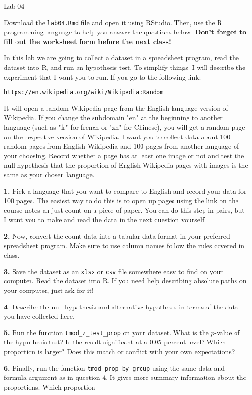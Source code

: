 \documentclass{tufte-handout}
\begin{document}
\justify

{\LARGE Lab 04}

\vspace*{18pt}

Download the \texttt{lab04.Rmd} file and open it using RStudio. Then, use the
R programming language to help you answer the questions below. \textbf{Don't
forget to fill out the worksheet form before the next class!}

In this lab we are going to collect a dataset in a spreadsheet
program, read the dataset into R, and run an hypothesis test. To simplify
things, I will describe the experiment that I want you to run. If you go
to the following link:

\begin{center}
\texttt{https://en.wikipedia.org/wiki/Wikipedia:Random}
\end{center}

It will open a random Wikipedia page from the English language version of
Wikipedia. If you change the subdomain "en" at the beginning to another
language (such as "fr" for french or "zh" for Chinese), you will get a random
page on the respective version of Wikipedia. I want you to collect data about
100 random pages from English Wikipedia and 100 pages from another language of
your choosing. Record whether a page has at least one image or not and test
the null-hypothesis that the proportion of English Wikipedia pages with images
is the same as your chosen language.

\vspace*{12pt}

\textbf{1.} Pick a language that you want to compare to English and record
your data for 100 pages. The easiest way to do this is to open up pages using
the link on the course notes an just count on a piece of paper. You can do
this step in pairs, but I want you to make and read the data in the next
question yourself.

\textbf{2.} Now, convert the count data into a tabular data format in your
preferred spreadsheet program. Make sure to use column names follow the rules
covered in class.

\textbf{3.} Save the dataset as an \texttt{xlsx} or \texttt{csv} file
somewhere easy to find on your computer. Read the dataset into R. If you need
help  describing absolute paths on your computer, just ask for it!

\textbf{4.} Describe the null-hypothesis and alternative hypothesis in terms
of the data you have collected here.

\textbf{5.} Run the function \texttt{tmod\_z\_test\_prop} on your dataset.
What is the $p$-value of the hypothesis test? Is the result significant at a
$0.05$ percent level? Which proportion is larger? Does this match or conflict
with your own expectations?

\textbf{6.} Finally, run the function \texttt{tmod\_prop\_by\_group} using
the same data and formula argument as in question 4. It gives more summary
information about the proportions. Which proportion
\end{document}
